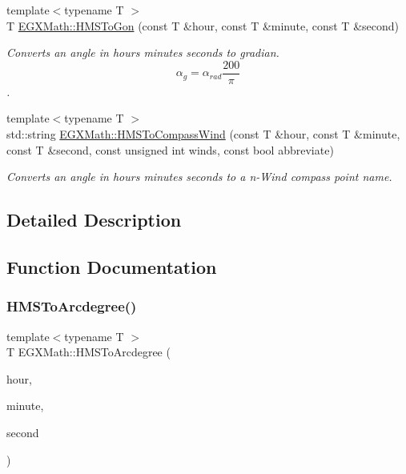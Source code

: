 \begin{DoxyCompactItemize}
{\footnotesize template$<$typename T $>$ }\\T \mbox{\hyperlink{group___e_g_x_math-_angle_conversions-_h_m_s_ga7751b1ea9b1874096023286240a91068}{E\+G\+X\+Math\+::\+H\+M\+S\+To\+Gon}} (const T \&hour, const T \&minute, const T \&second)
\begin{DoxyCompactList}\small\item\em Converts an angle in hours minutes seconds to gradian. \[\alpha_{g}=\alpha_{rad}\frac{200}{\pi}\]. \end{DoxyCompactList}\item 
{\footnotesize template$<$typename T $>$ }\\std\+::string \mbox{\hyperlink{group___e_g_x_math-_angle_conversions-_h_m_s_ga6374888f82360747241f6670e1b2048e}{E\+G\+X\+Math\+::\+H\+M\+S\+To\+Compass\+Wind}} (const T \&hour, const T \&minute, const T \&second, const unsigned int winds, const bool abbreviate)
\begin{DoxyCompactList}\small\item\em Converts an angle in hours minutes seconds to a n-\/\+Wind compass point name. \end{DoxyCompactList}\end{DoxyCompactItemize}


\subsection{Detailed Description}


\subsection{Function Documentation}
\mbox{\label{group___e_g_x_math-_angle_conversions-_h_m_s_gaf4a94d34cb0629049bbcab8775d2af43}} 
\subsubsection{\texorpdfstring{H\+M\+S\+To\+Arcdegree()}{HMSToArcdegree()}}
{\footnotesize\ttfamily template$<$typename T $>$ \\
T E\+G\+X\+Math\+::\+H\+M\+S\+To\+Arcdegree (\begin{DoxyParamCaption}\item[{const T \&}]{hour,  }\item[{const T \&}]{minute,  }\item[{const T \&}]{second }\end{DoxyParamCaption})}



